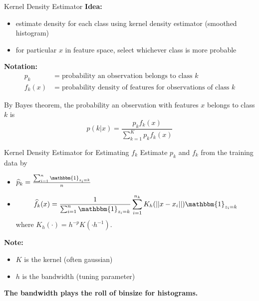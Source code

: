 \documentclass[12pt]{beamer}
\newcommand{\ind}{\mathbbm{1}}
\begin{document}
\begin{frame}{Kernel Density Estimator}
  \textbf{Idea:}
  \begin{itemize}
  \item estimate density for each class using kernel density estimator (smoothed histogram)
  \item for particular $x$ in feature space, select whichever class is more probable
  \end{itemize}

    \textbf{Notation:}
  \begin{align*}
    p_k &= \text{probability an observation belongs to class } k\\
    f_k(x) &= \text{probability density of features for observations of class } k
  \end{align*}

\vspace{.2in}
  
  By Bayes theorem, the probability an observation with features $x$ belongs to class $k$ is
  \begin{equation*}
    p(k|x) = \frac{p_k f_k(x)}{\sum_{k=1}^K p_k f_k(x)}
  \end{equation*}

\end{frame}



\begin{frame}{Kernel Density Estimator for Estimating $f_k$}
  Estimate $p_k$ and $f_k$ from the training data by
  \begin{itemize}
  \item $\widehat{p}_k = \frac{\sum_{i=1}^n \ind_{z_i=k}}{n}$
  \item 
  \begin{equation*}
    \widehat{f}_k(x) = \frac{1}{\sum_{i=1}^n \ind_{z_i=k}}\sum_{i=1}^{n_k} K_h(||x-x_i||)\ind_{z_i=k}
  \end{equation*}
where $K_h(\cdot) = h^{-p}K(\cdot h^{-1})$.
  \end{itemize}

\vspace{.2in}
  
  \textbf{Note:}
  \begin{itemize}
  \item $K$ is the kernel (often gaussian)
  \item $h$ is the bandwidth (tuning parameter)
  \end{itemize}

  \vspace{.3in}
  
  \begin{center}
    \textbf{The bandwidth plays the roll of binsize for histograms.}
  \end{center}

  
\end{frame}
\end{document}

